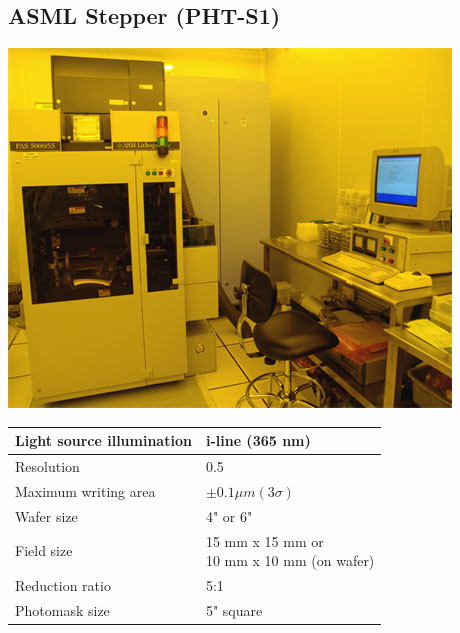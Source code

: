 \subsection{ASML Stepper (PHT-S1)}\label{lithography_machine}
\WaferClean\WaferSemiClean

\begin{minipage}[H]{\MachinePictureMiniPageWidth}
	\includegraphics[width=\MachinePictureWidth]{pictures_machines/litho_stepper.png}
\end{minipage}\begin{minipage}[H]{\MachineTextMiniPageWidth}
	\begin{tabular}{|p{4cm}|p{6cm}|}
		\hline
		Light source illumination &
		i-line (365 nm) \\
		\hline
		Resolution &
		0.5\um \\
		\hline
		Maximum writing area &
		$\pm 0.1 \mu m (3 \sigma)$ \\
		\hline
		Wafer size &
		4" or 6" \\
		\hline
		Field size &
		\makecell[l]{
			15 mm x 15 mm or \\
			10 mm x 10 mm (on wafer)
		} \\
		\hline
		Reduction ratio &
		5:1 \\
		\hline
		Photomask size &
		5" square \\
		\hline
	\end{tabular}
\end{minipage}
